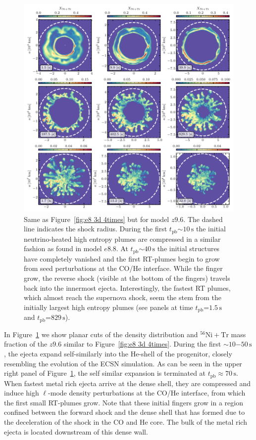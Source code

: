 \documentclass[fleqn,usenatbib]{mnras}
\newcommand{\tpb}{\ensuremath{t_{\text{pb}}}}
\newcommand{\nickel}{\ensuremath{\mathrm{^{56}Ni}}\xspace}
\newcommand{\tracer}{\ensuremath{\mathrm{Tr}}\xspace}
\newcommand{\s}{\ensuremath{\text{s}}}
\begin{document}
\begin{figure}%
 \centering
 \includegraphics[width=\textwidth,trim=0cm 1.5cm 0cm 0cm,clip]{pic/z9_3d_3x3_NiX.pdf}
 \caption{Same as Figure~\ref{fig:e8 3d 4times} but for model $z9.6$. The dashed line indicates the shock radius. During the first $\tpb\mathord{\sim} 10\,\s$ the initial neutrino-heated high entropy plumes are compressed in a similar fashion as found in model $e8.8$. At $\tpb\mathord{\sim}40\,\s$ the initial structures have completely vanished and the first RT-plumes begin to grow from seed perturbations at the CO/He interface. While the finger grow, the reverse shock (visible at the bottom of the fingers) travels back into the innermost ejecta. Interestingly, the fastest RT plumes, which almost reach the supernova shock, seem the stem from the initially largest high entropy plumes (see panels at time $\tpb\mathord{=}1.5\,\s$ and $\tpb\mathord{=}829\,\s$).
 }
 \label{fig:z9 3d 4times}
\end{figure}%

In Figure~\ref{fig:z9 3d 4times} we show planar cuts of the density distribution and $\nickel+\tracer$ mass fraction of the $z9.6$ similar to Figure~\ref{fig:e8 3d 4times}.
During the first $\sim 10\mathord{-}50\,\s$, the ejecta expand self-similarly into the He-shell of the progenitor, closely resembling the evolution of the ECSN simulation.
As can be seen in the upper right panel of Figure~\ref{fig:z9 3d 4times}, the self similar expansion is terminated at $t_{\mathrm{pb}}\approx 70\,\text{s}$.
When fastest metal rich ejecta arrive at the dense shell, they are compressed and induce high $\ell$-mode density perturbations at the CO/He interface, from which the first small RT-plumes grow.
Note that these initial fingers grow in a region confined between the forward shock and the dense shell that has formed due to the deceleration of the shock in the CO and He core. The bulk of the metal rich ejecta is located downstream of this dense wall.
\end{document}
